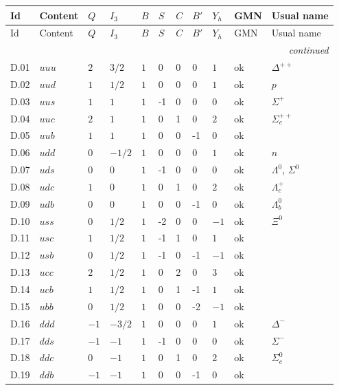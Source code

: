 {\scriptsize\setlength{\tabcolsep}{3pt}
\begin{longtable}{@{}llllllllll>{\raggedright\arraybackslash}p{3.2cm}@{}}
\toprule
Id & Content & $Q$ & $I_3$ & $B$ & $S$ & $C$ & $B'$ & $Y_h$ & GMN & Usual name \\
\midrule\endfirsthead
\toprule
Id & Content & $Q$ & $I_3$ & $B$ & $S$ & $C$ & $B'$ & $Y_h$ & GMN & Usual name \\
\midrule\endhead
\midrule\multicolumn{11}{r}{\emph{continued}}\\\endfoot
\bottomrule\endlastfoot
D.01 & $uuu$ & $2$ & $3/2$ & $1$ & 0 & 0 & 0 & $1$ & ok & $\Delta^{++}$ \\
D.02 & $uud$ & $1$ & $1/2$ & $1$ & 0 & 0 & 0 & $1$ & ok & $p$ \\
D.03 & $uus$ & $1$ & $1$ & $1$ & -1 & 0 & 0 & $0$ & ok & $\Sigma^{+}$ \\
D.04 & $uuc$ & $2$ & $1$ & $1$ & 0 & 1 & 0 & $2$ & ok & $\Sigma_c^{++}$ \\
D.05 & $uub$ & $1$ & $1$ & $1$ & 0 & 0 & -1 & $0$ & ok &  \\
D.06 & $udd$ & $0$ & $-1/2$ & $1$ & 0 & 0 & 0 & $1$ & ok & $n$ \\
D.07 & $uds$ & $0$ & $0$ & $1$ & -1 & 0 & 0 & $0$ & ok & $\Lambda^0$, $\Sigma^0$ \\
D.08 & $udc$ & $1$ & $0$ & $1$ & 0 & 1 & 0 & $2$ & ok & $\Lambda_c^+$ \\
D.09 & $udb$ & $0$ & $0$ & $1$ & 0 & 0 & -1 & $0$ & ok & $\Lambda_b^0$ \\
D.10 & $uss$ & $0$ & $1/2$ & $1$ & -2 & 0 & 0 & $-1$ & ok & $\Xi^0$ \\
D.11 & $usc$ & $1$ & $1/2$ & $1$ & -1 & 1 & 0 & $1$ & ok &  \\
D.12 & $usb$ & $0$ & $1/2$ & $1$ & -1 & 0 & -1 & $-1$ & ok &  \\
D.13 & $ucc$ & $2$ & $1/2$ & $1$ & 0 & 2 & 0 & $3$ & ok &  \\
D.14 & $ucb$ & $1$ & $1/2$ & $1$ & 0 & 1 & -1 & $1$ & ok &  \\
D.15 & $ubb$ & $0$ & $1/2$ & $1$ & 0 & 0 & -2 & $-1$ & ok &  \\
D.16 & $ddd$ & $-1$ & $-3/2$ & $1$ & 0 & 0 & 0 & $1$ & ok & $\Delta^{-}$ \\
D.17 & $dds$ & $-1$ & $-1$ & $1$ & -1 & 0 & 0 & $0$ & ok & $\Sigma^{-}$ \\
D.18 & $ddc$ & $0$ & $-1$ & $1$ & 0 & 1 & 0 & $2$ & ok & $\Sigma_c^{0}$ \\
D.19 & $ddb$ & $-1$ & $-1$ & $1$ & 0 & 0 & -1 & $0$ & ok &  \\

\end{longtable}}
